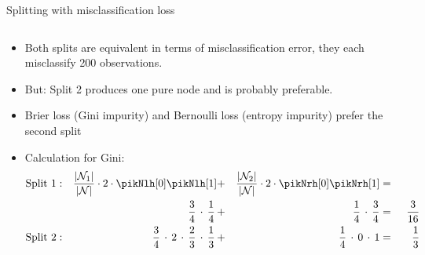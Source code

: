 \documentclass[11pt,compress,t,notes=noshow, xcolor=table]{beamer}
\begin{document}
\begin{vbframe}{Splitting with misclassification loss}
\begin{small}
\begin{columns}[T,onlytextwidth]
\begin{center}
\end{center}
\end{columns}
\end{small}

\lz

\begin{itemize}
\item Both splits are equivalent in terms of misclassification error, they each misclassify 200 observations. 
\item But: Split 2 produces one pure node and is probably preferable.
\item Brier loss (Gini impurity) and Bernoulli loss (entropy impurity) prefer the second split
\item Calculation for Gini:\\
\begin{alignat*}{6}
\text{Split 1}&:& \frac{|\Nl|}{|\Np|}\cdot 2 \cdot\pikNlh[0]\pikNlh[1] &+& \frac{|\Nr|}{|\Np|}\cdot 2 \cdot \pikNrh[0]\pikNrh[1] &=& \\
        && \,\, \frac{3}{4} \,\cdot\, \frac{1}{4} \,&+&\,  \, \frac{1}{4} \,\cdot\, \frac{3}{4} &=&\;\, \frac{3}{16}\\
\text{Split 2}&:& \frac{3}{4}\, \cdot\, 2 \,\cdot\,\frac{2}{3}\,\cdot\,\frac{1}{3}\, &+& \frac{1}{4} \,\cdot\, 0 \,\cdot\, 1 &=&\; \,\frac{1}{3}
\end{alignat*}
\end{itemize}
\end{vbframe}

 
 




\endlecture
\end{document}

